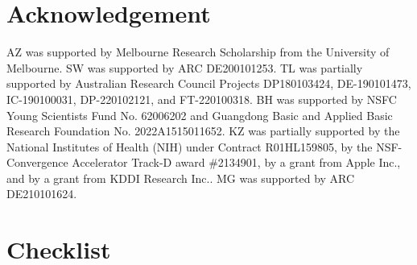 \documentclass{article}
\begin{document}

\section{Acknowledgement}

AZ was supported by Melbourne Research Scholarship from the University of Melbourne. 
SW was supported by ARC DE200101253.
TL was partially supported by Australian Research Council Projects DP180103424, DE-190101473, IC-190100031, DP-220102121, and FT-220100318.
BH was supported by NSFC Young Scientists Fund No. 62006202 and Guangdong Basic and Applied Basic Research Foundation No. 2022A1515011652.
KZ was partially supported by the National Institutes of Health (NIH) under Contract R01HL159805, by the NSF-Convergence Accelerator Track-D award \#2134901, by a grant from Apple Inc., and by a grant from KDDI Research Inc.. 
MG was supported by ARC DE210101624.  %


\clearpage



\clearpage
\section*{Checklist}
\end{document}
